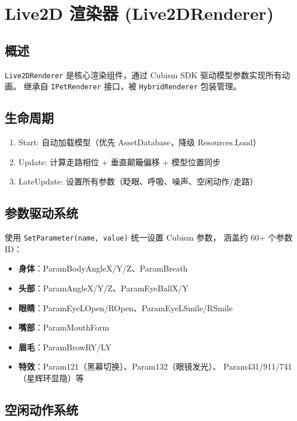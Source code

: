 \documentclass[12pt,a4paper]{ctexart}
\begin{document}
\section{Live2D 渲染器 (Live2DRenderer)}

\subsection{概述}

\texttt{Live2DRenderer} 是核心渲染组件，通过 Cubism SDK 驱动模型参数实现所有动画。
继承自 \texttt{IPetRenderer} 接口，被 \texttt{HybridRenderer} 包装管理。

\subsection{生命周期}

\begin{enumerate}
    \item Start: 自动加载模型（优先 AssetDatabase，降级 Resources.Load）
    \item Update: 计算走路相位 + 垂直颠簸偏移 + 模型位置同步
    \item LateUpdate: 设置所有参数（眨眼、呼吸、噪声、空闲动作/走路）
\end{enumerate}

\subsection{参数驱动系统}

使用 \texttt{SetParameter(name, value)} 统一设置 Cubism 参数，
涵盖约 60+ 个参数 ID：
\begin{itemize}
    \item \textbf{身体}：ParamBodyAngleX/Y/Z、ParamBreath
    \item \textbf{头部}：ParamAngleX/Y/Z、ParamEyeBallX/Y
    \item \textbf{眼睛}：ParamEyeLOpen/ROpen、ParamEyeLSmile/RSmile
    \item \textbf{嘴部}：ParamMouthForm
    \item \textbf{眉毛}：ParamBrowRY/LY
    \item \textbf{特效}：Param121（黑幕切换）、Param132（眼镜发光）、
        Param431/911/741（星辉环显隐）等
\end{itemize}

\subsection{空闲动作系统}
\end{document}
